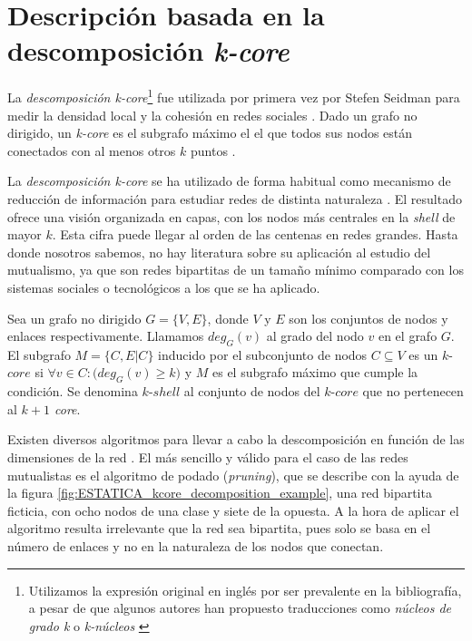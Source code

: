 \section{Descripción basada en la descomposición \textit{k-core}}

La \textit{descomposición k-core}\footnote{Utilizamos la expresión original en inglés por ser prevalente en la bibliografía, a pesar de que algunos autores han propuesto traducciones como \textit{núcleos de grado k} \cite{herrero2000terminologia} o \textit{k-núcleos} \cite{cardona2006taxonomia, martinez2011aplicacion}} fue utilizada por primera vez por Stefen Seidman para medir la densidad local y la cohesión en redes sociales \cite{seidman1983network}. Dado un grafo no dirigido, un \textit{k-core} es el subgrafo máximo el el que todos sus nodos están conectados con al menos otros $k$ puntos \cite{dorogovtsev2006k}.

La \textit{descomposición k-core} se ha utilizado de forma habitual como mecanismo de reducción de información para estudiar redes de distinta naturaleza \cite{kitsak2010identification, zhang2010using, barbera2015critical}. El resultado ofrece una visión organizada en capas, con los nodos más centrales en la \textit{shell} de mayor $k$. Esta cifra puede llegar al orden de las centenas en redes grandes. Hasta donde nosotros sabemos, no hay literatura sobre su aplicación al estudio del mutualismo, ya que son redes bipartitas de un tamaño mínimo comparado con los sistemas sociales o tecnológicos a los que se ha aplicado.

\begin{theo} 
Sea un grafo no dirigido $G = \{V, E\}$, donde $V$ y $E$ son los conjuntos de nodos y enlaces respectivamente. Llamamos $deg_G(v)$ al grado del nodo $v$ en el grafo $G$. El subgrafo $M = \{C, E|C\}$ inducido por el subconjunto de nodos $C \subseteq V$ es
un $k$-$core$ si $\forall v \in C: \big( deg_G(v) \geq k \big)$ y $M$ es el subgrafo máximo que cumple la condición. Se denomina $k$-$shell$ al conjunto de nodos del $k$-$core$ que no pertenecen al \textit{$k+1$ core}.
\label{ESTATICA_def_kcore}
\end{theo}

Existen diversos algoritmos para llevar a cabo la descomposición en función de las dimensiones de la red \cite{montresor2013distributed}. El más sencillo y válido para el caso de las redes mutualistas es el algoritmo de podado (\textit{pruning}), que se describe con la ayuda de la figura \ref{fig:ESTATICA_kcore_decomposition_example}, una red bipartita ficticia, con ocho nodos de una clase y siete de la opuesta. A la hora de aplicar el algoritmo resulta irrelevante que la red sea bipartita, pues solo se basa en el número de enlaces y no en la naturaleza de los nodos que conectan.

